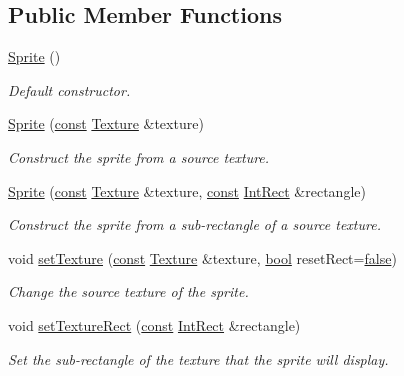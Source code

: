 \subsection*{Public Member Functions}
\begin{DoxyCompactItemize}
\item 
\hyperlink{classsf_1_1_sprite_a92559fbca895a96758abf5eabab96984}{Sprite} ()
\begin{DoxyCompactList}\small\item\em Default constructor. \end{DoxyCompactList}\item 
\hyperlink{classsf_1_1_sprite_a2a9fca374d7abf084bb1c143a879ff4a}{Sprite} (\hyperlink{term__entry_8h_a57bd63ce7f9a353488880e3de6692d5a}{const} \hyperlink{classsf_1_1_texture}{Texture} \&texture)
\begin{DoxyCompactList}\small\item\em Construct the sprite from a source texture. \end{DoxyCompactList}\item 
\hyperlink{classsf_1_1_sprite_a01cfe1402372d243dbaa2ffa96020206}{Sprite} (\hyperlink{term__entry_8h_a57bd63ce7f9a353488880e3de6692d5a}{const} \hyperlink{classsf_1_1_texture}{Texture} \&texture, \hyperlink{term__entry_8h_a57bd63ce7f9a353488880e3de6692d5a}{const} \hyperlink{namespacesf_a1b1279ab06950b96686cffaacb72fed5}{Int\-Rect} \&rectangle)
\begin{DoxyCompactList}\small\item\em Construct the sprite from a sub-\/rectangle of a source texture. \end{DoxyCompactList}\item 
void \hyperlink{classsf_1_1_sprite_a3729c88d88ac38c19317c18e87242560}{set\-Texture} (\hyperlink{term__entry_8h_a57bd63ce7f9a353488880e3de6692d5a}{const} \hyperlink{classsf_1_1_texture}{Texture} \&texture, \hyperlink{term__entry_8h_a002004ba5d663f149f6c38064926abac}{bool} reset\-Rect=\hyperlink{_snake_8cpp_ae6c865df784842196d411c1466b01686}{false})
\begin{DoxyCompactList}\small\item\em Change the source texture of the sprite. \end{DoxyCompactList}\item 
void \hyperlink{classsf_1_1_sprite_a3fefec419a4e6a90c0fd54c793d82ec2}{set\-Texture\-Rect} (\hyperlink{term__entry_8h_a57bd63ce7f9a353488880e3de6692d5a}{const} \hyperlink{namespacesf_a1b1279ab06950b96686cffaacb72fed5}{Int\-Rect} \&rectangle)
\begin{DoxyCompactList}\small\item\em Set the sub-\/rectangle of the texture that the sprite will display. \end{DoxyCompactList}\item 

\end{DoxyCompactItemize}
